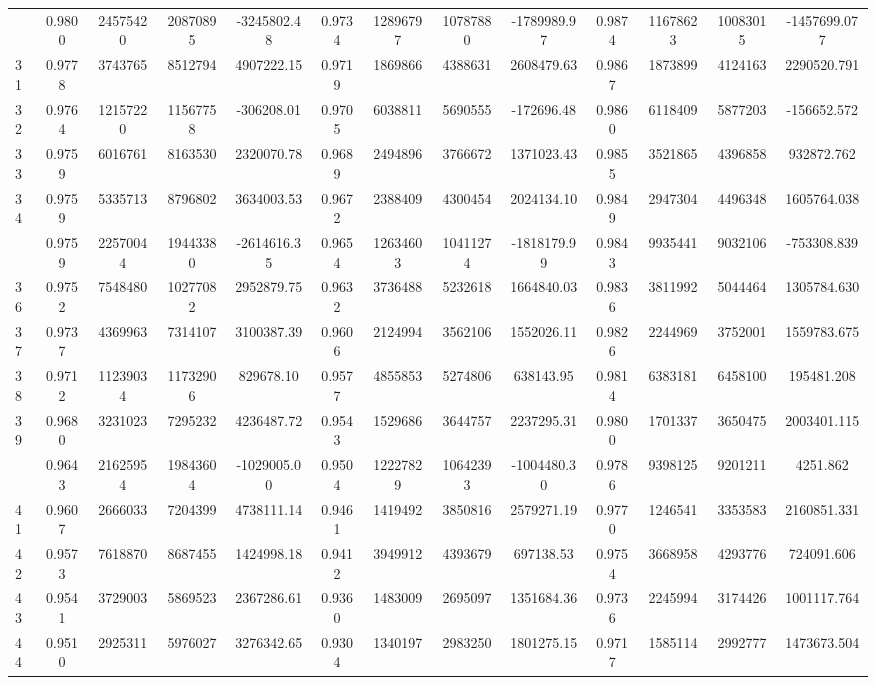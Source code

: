 \documentclass[
  12pt,
]{article}
\begin{document}
\begin{longtable}[t]{lcccccccccccc}
\addlinespace
30 & 0.9800 & 24575420 & 20870895 & -3245802.48 & 0.9734 & 12896797 & 10787880 & -1789989.97 & 0.9874 & 11678623 & 10083015 & -1457699.077\\
31 & 0.9778 & 3743765 & 8512794 & 4907222.15 & 0.9719 & 1869866 & 4388631 & 2608479.63 & 0.9867 & 1873899 & 4124163 & 2290520.791\\
32 & 0.9764 & 12157220 & 11567758 & -306208.01 & 0.9705 & 6038811 & 5690555 & -172696.48 & 0.9860 & 6118409 & 5877203 & -156652.572\\
33 & 0.9759 & 6016761 & 8163530 & 2320070.78 & 0.9689 & 2494896 & 3766672 & 1371023.43 & 0.9855 & 3521865 & 4396858 & 932872.762\\
34 & 0.9759 & 5335713 & 8796802 & 3634003.53 & 0.9672 & 2388409 & 4300454 & 2024134.10 & 0.9849 & 2947304 & 4496348 & 1605764.038\\
\addlinespace
35 & 0.9759 & 22570044 & 19443380 & -2614616.35 & 0.9654 & 12634603 & 10411274 & -1818179.99 & 0.9843 & 9935441 & 9032106 & -753308.839\\
36 & 0.9752 & 7548480 & 10277082 & 2952879.75 & 0.9632 & 3736488 & 5232618 & 1664840.03 & 0.9836 & 3811992 & 5044464 & 1305784.630\\
37 & 0.9737 & 4369963 & 7314107 & 3100387.39 & 0.9606 & 2124994 & 3562106 & 1552026.11 & 0.9826 & 2244969 & 3752001 & 1559783.675\\
38 & 0.9712 & 11239034 & 11732906 & 829678.10 & 0.9577 & 4855853 & 5274806 & 638143.95 & 0.9814 & 6383181 & 6458100 & 195481.208\\
39 & 0.9680 & 3231023 & 7295232 & 4236487.72 & 0.9543 & 1529686 & 3644757 & 2237295.31 & 0.9800 & 1701337 & 3650475 & 2003401.115\\
\addlinespace
40 & 0.9643 & 21625954 & 19843604 & -1029005.00 & 0.9504 & 12227829 & 10642393 & -1004480.30 & 0.9786 & 9398125 & 9201211 & 4251.862\\
41 & 0.9607 & 2666033 & 7204399 & 4738111.14 & 0.9461 & 1419492 & 3850816 & 2579271.19 & 0.9770 & 1246541 & 3353583 & 2160851.331\\
42 & 0.9573 & 7618870 & 8687455 & 1424998.18 & 0.9412 & 3949912 & 4393679 & 697138.53 & 0.9754 & 3668958 & 4293776 & 724091.606\\
43 & 0.9541 & 3729003 & 5869523 & 2367286.61 & 0.9360 & 1483009 & 2695097 & 1351684.36 & 0.9736 & 2245994 & 3174426 & 1001117.764\\
44 & 0.9510 & 2925311 & 5976027 & 3276342.65 & 0.9304 & 1340197 & 2983250 & 1801275.15 & 0.9717 & 1585114 & 2992777 & 1473673.504\\

\end{longtable}
\end{document}
